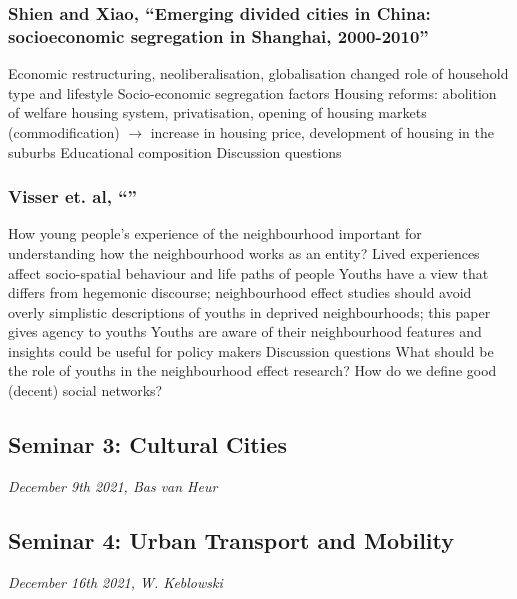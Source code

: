 \documentclass{article}
\begin{document}
\subsubsection{Shien and Xiao, ``Emerging divided cities in China: socioeconomic segregation in Shanghai, 2000-2010''}
\begin{outline}
	\1 Economic restructuring, neoliberalisation, globalisation changed role of household type and lifestyle
	\1 	Socio-economic segregation factors
		\2 Housing reforms: abolition of welfare housing system, privatisation, opening of housing markets (commodification) $\rightarrow$ increase in housing price, development of housing in the suburbs
		\2 Educational composition
	\1 Discussion questions
		\2 
\end{outline}


\subsubsection{Visser et. al, ``''}
\begin{outline}
	\1 How young people's experience of the neighbourhood important for understanding how the neighbourhood works as an entity?
		\2 Lived experiences affect socio-spatial behaviour and life paths of people 
		\2 Youths have a view that differs from hegemonic discourse; neighbourhood effect studies should avoid overly simplistic descriptions of youths in deprived neighbourhoods; this paper gives agency to youths 
		\2 Youths are aware of their neighbourhood features and insights could be useful for policy makers
	\1 Discussion questions
		\2 What should be the role of youths in the neighbourhood effect research?
		\2 How do we define good (decent) social networks?
\end{outline}


\subsection{Seminar 3: Cultural Cities}
\textit{December 9th 2021, Bas van Heur}


\subsection{Seminar 4: Urban Transport and Mobility}
\textit{December 16th 2021, W. Keblowski}


\end{document}
